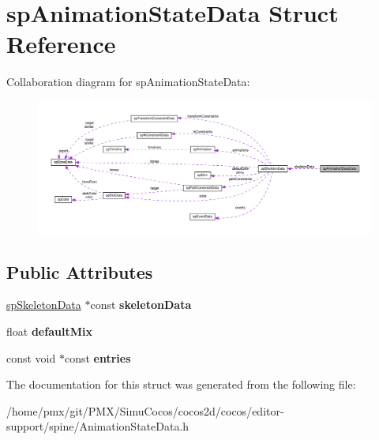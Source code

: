 \hypertarget{structspAnimationStateData}{}\section{sp\+Animation\+State\+Data Struct Reference}
\label{structspAnimationStateData}


Collaboration diagram for sp\+Animation\+State\+Data\+:
\nopagebreak
\begin{figure}[H]
\begin{center}
\leavevmode
\includegraphics[width=350pt]{structspAnimationStateData__coll__graph}
\end{center}
\end{figure}
\subsection*{Public Attributes}
\begin{DoxyCompactItemize}
\item 
\mbox{\label{structspAnimationStateData_a6c7e29daa08f07440be509f38e8da4fb}} 
\hyperlink{structspSkeletonData}{sp\+Skeleton\+Data} $\ast$const {\bfseries skeleton\+Data}
\item 
\mbox{\label{structspAnimationStateData_a560e10e6e2ae884064d569a5b85a5509}} 
float {\bfseries default\+Mix}
\item 
\mbox{\label{structspAnimationStateData_a39c76d980487e094f4eae08a26cb0a02}} 
const void $\ast$const {\bfseries entries}
\end{DoxyCompactItemize}


The documentation for this struct was generated from the following file\+:\begin{DoxyCompactItemize}
\item 
/home/pmx/git/\+P\+M\+X/\+Simu\+Cocos/cocos2d/cocos/editor-\/support/spine/Animation\+State\+Data.\+h\end{DoxyCompactItemize}
